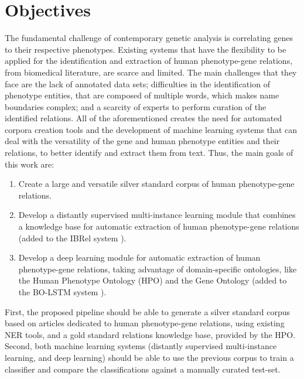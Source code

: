 
\hypertarget{1.2}{\section{Objectives}}

The fundamental challenge of contemporary genetic analysis is correlating genes to their respective phenotypes. Existing systems that have the flexibility to be applied for the identification and extraction of human phenotype-gene relations, from biomedical literature, are scarce and limited. The main challenges that they face are the lack of annotated data sets; difficulties in the identification of phenotype entities, that are composed of multiple words, which makes name boundaries complex; and a scarcity of experts to perform curation of the identified relations. All of the aforementioned creates the need for automated corpora creation tools and the development of machine learning systems that can deal with the versatility of the gene and human phenotype entities and their relations, to better identify and extract them from text. Thus, the main goals of this work are:

\begin{enumerate}
\item{Create a large and versatile silver standard corpus of human phenotype-gene relations.}

\item{Develop a distantly supervised multi-instance learning module that combines a knowledge base for automatic extraction of human phenotype-gene relations (added to the IBRel system \citep{10.1371/journal.pone.0171929}).}

\item{Develop a deep learning module for automatic extraction of human phenotype-gene relations, taking advantage of domain-specific ontologies, like the Human Phenotype Ontology (HPO) and the Gene Ontology (added to the BO-LSTM system \citep{BOLSTM}).}
\end{enumerate}

First, the proposed pipeline should be able to generate a silver standard corpus based on articles dedicated to human phenotype-gene relations, using existing NER tools, and a gold standard relations knowledge base, provided by the HPO. Second, both machine learning systems (distantly supervised multi-instance learning, and deep learning) should be able to use the previous corpus to train a classifier and compare the classifications against a manually curated test-set.

